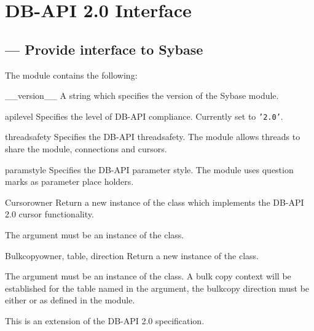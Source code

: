 \chapter{DB-API 2.0 Interface}

\localmoduletable

\section{ --- Provide interface to Sybase}



The  module contains the following:

\begin{datadesc}{__version__}
A string which specifies the version of the Sybase module.
\end{datadesc}

\begin{datadesc}{apilevel}
Specifies the level of DB-API compliance.  Currently set to
\texttt{'2.0'}.
\end{datadesc}

\begin{datadesc}{threadsafety}
Specifies the DB-API threadsafety.  The  module allows
threads to share the module, connections and cursors.
\end{datadesc}

\begin{datadesc}{paramstyle}
Specifies the DB-API parameter style.  The  module uses
question marks as parameter place holders.
\end{datadesc}

\begin{classdesc}{Cursor}{owner}
Return a new instance of the  class which implements the
DB-API 2.0 cursor functionality.

The  argument must be an instance of the 
class.
\end{classdesc}

\begin{classdesc}{Bulkcopy}{owner, table, direction}
Return a new instance of the  class.

The  argument must be an instance of the 
class.  A bulk copy context will be established for the table named in
the  argument, the bulkcopy direction must be either
 or  as defined in the
 module.

This is an extension of the DB-API 2.0 specification.
\end{classdesc}

